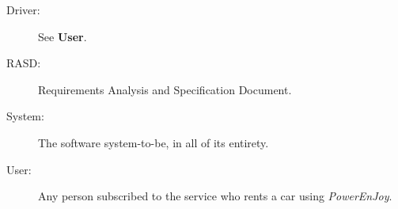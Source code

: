 \begin{description}
\item[Driver:] See \textbf{User}.
\item[RASD:] Requirements Analysis and Specification Document.
\item[System:] The software system-to-be, in all of its entirety.
\item[User:] Any person subscribed to the service who rents a car using \hbox{\emph{PowerEnJoy}}.
\end{description}

